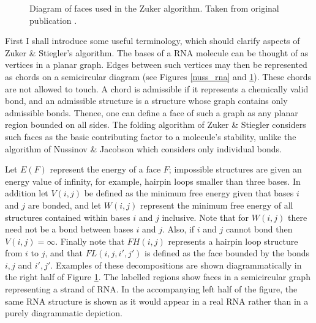 \documentclass{cshonours}
\begin{document}
\begin{figure}
\begin{center}
\end{center}
\caption{Diagram of faces used in the Zuker algorithm. Taken from original
publication \cite{zuker1981optimal}.}
\label{zuk_struct}
\end{figure}

First I shall introduce some useful terminology, which should clarify aspects of Zuker \& Stiegler’s
algorithm. The bases of a RNA molecule can be thought of as vertices in a planar graph. Edges between such vertices may then be represented as chords on a semicircular diagram (see Figures \ref{nuss_rna} and \ref{zuk_struct}). These chords are not allowed to touch. A chord
is admissible if it represents a chemically valid bond, and an
admissible structure is a structure whose graph contains only admissible bonds.
Thence, one can define a face of such a graph as any planar region bounded on all
sides. The
folding algorithm of Zuker \& Stiegler considers such faces as the basic contributing factor to a molecule's stability, unlike the algorithm of Nussinov \& Jacobson
which considers only individual bonds.


Let $E(F)$ represent the energy of a face $F$; impossible structures are given
an energy value of infinity, for example, hairpin loops smaller than three bases. In addition let $V(i, j)$ be defined as the minimum free
energy given that bases $i$ and $j$ are bonded, and let $W(i, j)$ represent
the minimum free energy of all structures contained within bases $i$ and $j$ inclusive.
Note that for $W(i, j)$ there need not be a bond between bases $i$ and $j$. Also,
if $i$ and $j$ cannot bond then $V(i, j) = \infty $. Finally note that $FH(i, j)$ represents a
hairpin loop structure from $i$ to $j$, and that $FL(i, j, i' , j' )$ is defined as the face bounded by the bonds $i, j$ and $i', j'$. Examples of these decompositions are shown
diagrammatically in the right half of Figure \ref{zuk_struct}. The labelled regions show faces
in a semicircular graph representing a strand of RNA. In the accompanying left
half of the figure, the same RNA structure is shown as it would appear in a real
RNA rather than in a purely diagrammatic depiction.
\end{document}
